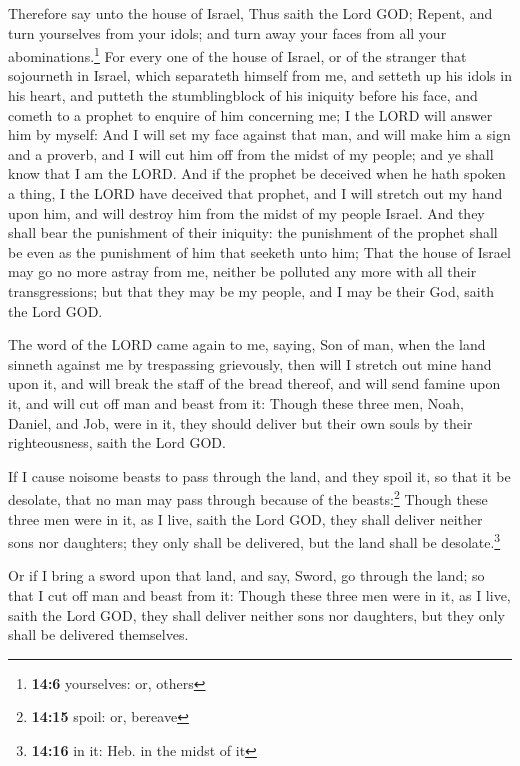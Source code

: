  Therefore say unto the house of Israel, Thus saith the
Lord GOD; Repent, and turn yourselves from your idols; and turn away
your faces from all your abominations.\footnote{\textbf{14:6}
  yourselves: or, others}  For every one of the house of
Israel, or of the stranger that sojourneth in Israel, which separateth
himself from me, and setteth up his idols in his heart, and putteth the
stumblingblock of his iniquity before his face, and cometh to a prophet
to enquire of him concerning me; I the LORD will answer him by myself:
 And I will set my face against that man, and will make
him a sign and a proverb, and I will cut him off from the midst of my
people; and ye shall know that I am the LORD.  And if the
prophet be deceived when he hath spoken a thing, I the LORD have
deceived that prophet, and I will stretch out my hand upon him, and will
destroy him from the midst of my people Israel.  And they
shall bear the punishment of their iniquity: the punishment of the
prophet shall be even as the punishment of him that seeketh unto him;
 That the house of Israel may go no more astray from me,
neither be polluted any more with all their transgressions; but that
they may be my people, and I may be their God, saith the Lord GOD.

 The word of the LORD came again to me, saying,
 Son of man, when the land sinneth against me by
trespassing grievously, then will I stretch out mine hand upon it, and
will break the staff of the bread thereof, and will send famine upon it,
and will cut off man and beast from it:  Though these
three men, Noah, Daniel, and Job, were in it, they should deliver but
their own souls by their righteousness, saith the Lord GOD.

 If I cause noisome beasts to pass through the land, and
they spoil it, so that it be desolate, that no man may pass through
because of the beasts:\footnote{\textbf{14:15} spoil: or, bereave}
 Though these three men were in it, as I live, saith the
Lord GOD, they shall deliver neither sons nor daughters; they only shall
be delivered, but the land shall be desolate.\footnote{\textbf{14:16} in
  it: Heb. in the midst of it}

 Or if I bring a sword upon that land, and say, Sword, go
through the land; so that I cut off man and beast from it:
 Though these three men were in it, as I live, saith the
Lord GOD, they shall deliver neither sons nor daughters, but they only
shall be delivered themselves.

